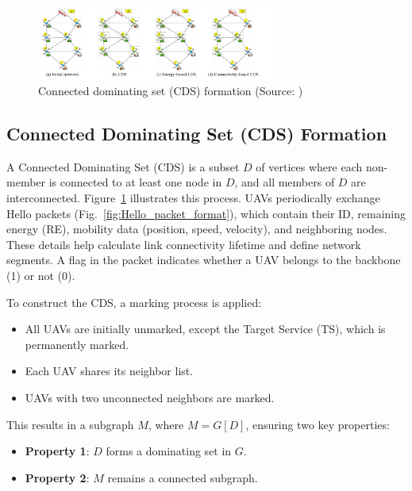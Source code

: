 \vspace{\baselineskip} %

\begin{figure}[H]
    \centering
    \includegraphics[width=0.7\textwidth]{Figures/Chapter3/Method5/1.png}
    \caption{Connected dominating set (CDS) formation (Source: \cite{oubbati2019leveraging})}
    \label{fig:CDS}
\end{figure}




\subsection{Connected Dominating Set (CDS) Formation}
A Connected Dominating Set (CDS) is a subset \( D \) of vertices where each non-member is connected to at least one node in \( D \), and all members of \( D \) are interconnected. Figure~\ref{fig:CDS} illustrates this process. UAVs periodically exchange Hello packets (Fig.~\ref{fig:Hello_packet_format}), which contain their ID, remaining energy (RE), mobility data (position, speed, velocity), and neighboring nodes. These details help calculate link connectivity lifetime and define network segments. A flag in the packet indicates whether a UAV belongs to the backbone (1) or not (0).

To construct the CDS, a marking process is applied:
\begin{itemize}
    \item All UAVs are initially unmarked, except the Target Service (TS), which is permanently marked.
    \item Each UAV shares its neighbor list.
    \item UAVs with two unconnected neighbors are marked.
\end{itemize}

This results in a subgraph \( M \), where \( M = G[D] \), ensuring two key properties:
\begin{itemize}
    \item \textbf{Property 1}: \( D \) forms a dominating set in \( G \).
    \item \textbf{Property 2}: \( M \) remains a connected subgraph.
\end{itemize}

